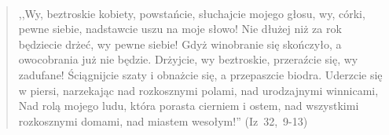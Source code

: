 \documentclass[10pt,a4paper,oneside]{article}
\begin{document}
\paragraph{}
\begin{quote}
,,Wy, beztroskie kobiety, powstańcie, słuchajcie mojego głosu, wy, córki, pewne siebie, nadstawcie uszu na moje słowo! Nie dłużej niż za rok będziecie drżeć, wy pewne siebie! Gdyż winobranie się skończyło, a owocobrania już nie będzie. Drżyjcie, wy beztroskie, przeraźcie się, wy zadufane! Ściągnijcie szaty i obnażcie się, a przepaszcie biodra. Uderzcie się w piersi, narzekając nad rozkosznymi polami, nad urodzajnymi winnicami, Nad rolą mojego ludu, która porasta cierniem i ostem, nad wszystkimi rozkosznymi domami, nad miastem wesołym!'' \mbox{(Iz 32, 9-13)}
\end{quote}
\end{document}
